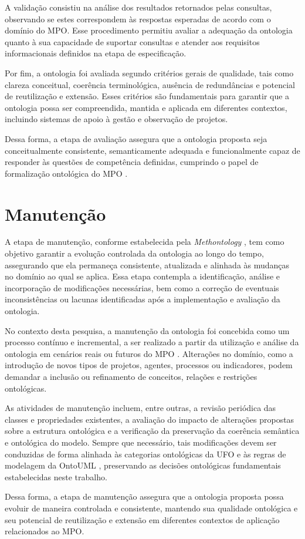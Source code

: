 A validação consistiu na análise dos resultados retornados pelas consultas, observando se estes correspondem às respostas esperadas de acordo com o domínio do MPO. Esse procedimento permitiu avaliar a adequação da ontologia quanto à sua capacidade de suportar consultas e atender aos requisitos informacionais definidos na etapa de especificação.

Por fim, a ontologia foi avaliada segundo critérios gerais de qualidade, tais como clareza conceitual, coerência terminológica, ausência de redundâncias e potencial de reutilização e extensão. Esses critérios são fundamentais para garantir que a ontologia possa ser compreendida, mantida e aplicada em diferentes contextos, incluindo sistemas de apoio à gestão e observação de projetos.

Dessa forma, a etapa de avaliação assegura que a ontologia proposta seja conceitualmente consistente, semanticamente adequada e funcionalmente capaz de responder às questões de competência definidas, cumprindo o papel de formalização ontológica do MPO \cite{vieira2022thesis}.

\section{Manutenção}
A etapa de manutenção, conforme estabelecida pela \textit{Methontology} \cite{fernandez1997methontology}, tem como objetivo garantir a evolução controlada da ontologia ao longo do tempo, assegurando que ela permaneça consistente, atualizada e alinhada às mudanças no domínio ao qual se aplica. Essa etapa contempla a identificação, análise e incorporação de modificações necessárias, bem como a correção de eventuais inconsistências ou lacunas identificadas após a implementação e avaliação da ontologia.

No contexto desta pesquisa, a manutenção da ontologia foi concebida como um processo contínuo e incremental, a ser realizado a partir da utilização e análise da ontologia em cenários reais ou futuros do MPO \cite{vieira2022thesis}. Alterações no domínio, como a introdução de novos tipos de projetos, agentes, processos ou indicadores, podem demandar a inclusão ou refinamento de conceitos, relações e restrições ontológicas.

As atividades de manutenção incluem, entre outras, a revisão periódica das classes e propriedades existentes, a avaliação do impacto de alterações propostas sobre a estrutura ontológica e a verificação da preservação da coerência semântica e ontológica do modelo. Sempre que necessário, tais modificações devem ser conduzidas de forma alinhada às categorias ontológicas da UFO \cite{guizzardi2008grounding} e às regras de modelagem da OntoUML \cite{ontouml_readthedocs}, preservando as decisões ontológicas fundamentais estabelecidas neste trabalho.

Dessa forma, a etapa de manutenção assegura que a ontologia proposta possa evoluir de maneira controlada e consistente, mantendo sua qualidade ontológica e seu potencial de reutilização e extensão em diferentes contextos de aplicação relacionados ao MPO.
